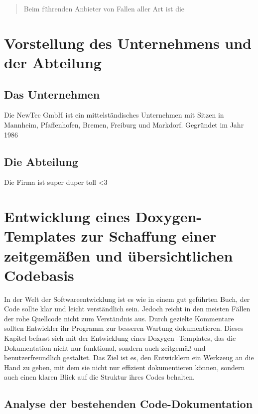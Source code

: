 \documentclass[11pt,a4paper]{report}
\begin{document}

\begin{abstract}
  Beim führenden Anbieter von Fallen aller Art ist die

\end{abstract}

\tableofcontents

\chapter{Vorstellung des Unternehmens und der Abteilung} \label{chap:einf}
\section{Das Unternehmen} \label{sec::company}

Die NewTec GmbH ist ein mittelständisches Unternehmen mit Sitzen in Mannheim, Pfaffenhofen, Bremen, Freiburg
und Markdorf. Gegründet im Jahr 1986


\section{Die Abteilung}

Die Firma ist super duper toll <3

\chapter{Entwicklung eines Doxygen-Templates zur Schaffung einer
zeitgemäßen und übersichtlichen Codebasis} \label{chap:ppv}

In der Welt der Softwareentwicklung ist es wie in einem gut geführten Buch, der Code sollte
klar und leicht verständlich sein. Jedoch reicht in den meisten Fällen der rohe Quellcode nicht
zum Verständnis aus. Durch gezielte Kommentare sollten Entwickler ihr Programm zur besseren Wartung
dokumentieren. Dieses Kapitel befasst sich mit der Entwicklung eines 
Doxygen -Templates, das die Dokumentation nicht nur funktional, sondern auch zeitgemäß und
benutzerfreundlich gestaltet. Das Ziel ist es, den Entwicklern ein Werkzeug an die Hand zu 
geben, mit dem sie nicht nur effizient dokumentieren können, sondern auch einen klaren Blick auf
die Struktur ihres Codes behalten.

\section{Analyse der bestehenden Code-Dokumentation} \label{sec:was}
\end{document}

